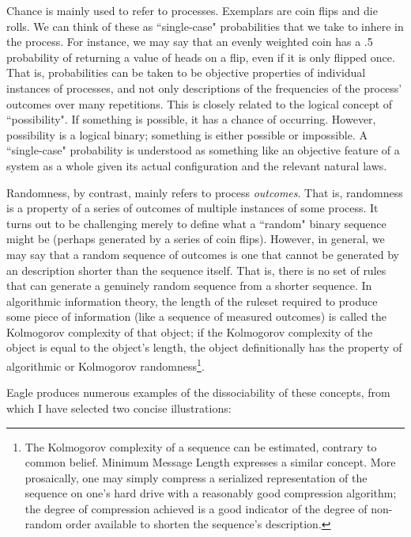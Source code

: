 Chance is mainly used to refer to processes. Exemplars are coin flips and die rolls. We can think of these as ``single-case" probabilities that we take to inhere in the process. For instance, we may say that an evenly weighted coin has a .5 probability of returning a value of heads on a flip, even if it is only flipped once. That is, probabilities can be taken to be objective properties of individual instances of processes, and not only descriptions of the frequencies of the process' outcomes over many repetitions. This is closely related to the logical concept of ``possibility". If something is possible, it has a chance of occurring. However, possibility is a logical binary; something is either possible or impossible. A ``single-case" probability is understood as something like an objective feature of a system as a whole given its actual configuration and the relevant natural laws.  

Randomness, by contrast, mainly refers to process \textit{outcomes}. That is, randomness is a property of a series of outcomes of multiple instances of some process. It turns out to be challenging merely to define what a ``random" binary sequence might be (perhaps generated by a series of coin flips). However, in general, we may say that a random sequence of outcomes is one that cannot be generated by an description shorter than the sequence itself. That is, there is no set of rules that can generate a genuinely random sequence from a shorter sequence. In algorithmic information theory, the length of the ruleset required to produce some piece of information (like a sequence of measured outcomes) is called the Kolmogorov complexity of that object; if the Kolmogorov complexity of the object is equal to the object's length, the object definitionally has the property of algorithmic or Kolmogorov randomness\footnote{The Kolmogorov complexity of a sequence can be estimated, contrary to common belief\cite{Li2008}. Minimum Message Length expresses a similar concept. More prosaically, one may simply compress a serialized representation of the sequence on one's hard drive with a reasonably good compression algorithm; the degree of compression achieved is a good indicator of the degree of non-random order available to shorten the sequence's description.}.

Eagle produces numerous examples of the dissociability of these concepts, from which I have selected two concise illustrations:

